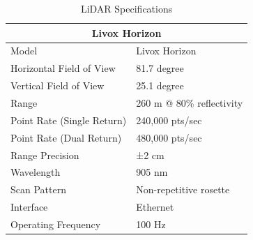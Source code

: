 \documentclass{erauthesis}
\begin{document}
\begin{table}[htpb]
\centering
\begin{tabular}{ll}
\hline
\multicolumn{2}{c}{Livox Horizon}\\
\hline
\hline
Model & Livox Horizon \\
Horizontal Field of View & 81.7 degree \\
Vertical Field of View & 25.1 degree \\
Range & 260 m @ 80\% reflectivity \\
Point Rate (Single Return) & 240,000 pts/sec \\
Point Rate (Dual Return) & 480,000 pts/sec \\
Range Precision & ±2 cm \\
Wavelength & 905 nm \\
Scan Pattern & Non-repetitive rosette \\
Interface & Ethernet \\
Operating Frequency & 100 Hz \\
\hline
\end{tabular}
\caption{LiDAR Specifications}
\label{table:livox_horizon_specs}
\end{table}



\end{document}
